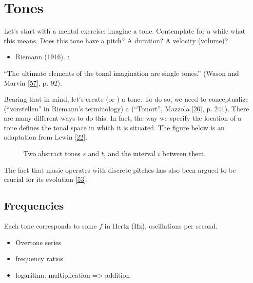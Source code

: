 \documentclass[letterpaper,10pt,english]{sphinxmanual}
\begin{document}
\section{Tones}
\label{\detokenize{1_fundamentals:tones}}
\sphinxAtStartPar
Let’s start with a mental exercise: imagine a tone.
Contemplate for a while what this means.
Does this tone have a pitch? A duration? A velocity (volume)?
\begin{itemize}
\item {} 
\sphinxAtStartPar
Riemann (1916). :

\end{itemize}

\sphinxAtStartPar
“The ultimate elements of the tonal imagination are single tones.”
(Wason and Marvin {[}\hyperlink{cite.8_bibliography:id13}{57}{]}, p. 92).

\sphinxAtStartPar
Bearing that in mind, let’s create (or ) a tone. To do so, we need to
conceptualize (“vorstellen” in Riemann’s terminology) a 
(“Tonort”, Mazzola {[}\hyperlink{cite.8_bibliography:id35}{26}{]}, p. 241).
There are many different ways to do this. In fact, the way we specify the location of a tone
defines the tonal space in which it is situated.
The figure below is an adaptation from Lewin {[}\hyperlink{cite.8_bibliography:id2}{22}{]}.
\begin{figure}[htbp]\centering\capstart{}\caption{Two abstract tones \(s\) and \(t\), and the interval \(i\) between them.}\label{\detokenize{1_fundamentals:id8}}\end{figure}
\sphinxAtStartPar
The fact that music operates with discrete pitches has also been argued to be crucial for its
evolution {[}\hyperlink{cite.8_bibliography:id38}{53}{]}.


\subsection{Frequencies}
\label{\detokenize{1_fundamentals:frequencies}}
\sphinxAtStartPar
Each tone corresponds to some  \(f\) in Hertz (Hz),
oscillations per second.
\begin{itemize}
\item {} 
\sphinxAtStartPar
Overtone series

\item {} 
\sphinxAtStartPar
frequency ratios

\item {} 
\sphinxAtStartPar
logarithm: multiplication =\textgreater{} addition

\end{itemize}
\end{document}
